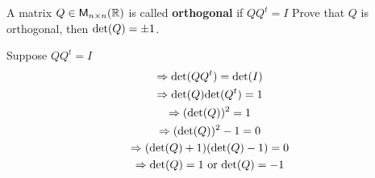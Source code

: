 A matrix $Q \in \mathsf{M}_{n \times n}(\mathbb{R})$ is called {\bf orthogonal} if
$QQ^t= I$  Prove that $Q$ is orthogonal, then $\text{det}({Q}) = \pm 1$.

Suppose $QQ^t = I $
\begin{gather}
\Rightarrow \text{det}({QQ^t}) = \text{det}({I})\\
\Rightarrow \text{det}({Q})\text{det}({Q^t}) = 1\\
\Rightarrow (\text{det}({Q}))^2 = 1 \\
\Rightarrow (\text{det}({Q}))^2 - 1  =0\\
\Rightarrow (\text{det}({Q}) +1)(\text{det}({Q})-1) = 0\\
\Rightarrow \text{det}({Q}) = 1 \text{ or } \text{det}({Q}) = -1
\end{gather}
